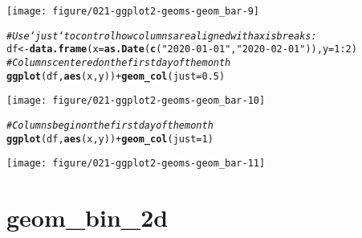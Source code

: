 \documentclass[a4paper,titlepage]{tufte-handout}\usepackage[]{graphicx}\usepackage[]{xcolor}
\makeatletter
\def\maxwidth{ %
  \ifdim\Gin@nat@width>\linewidth
    \linewidth
  \else
    \Gin@nat@width
  \fi
}
\newcommand{\hlnum}[1]{\textcolor[rgb]{0.686,0.059,0.569}{#1}}%
\newcommand{\hlsng}[1]{\textcolor[rgb]{0.192,0.494,0.8}{#1}}%
\newcommand{\hlcom}[1]{\textcolor[rgb]{0.678,0.584,0.686}{\textit{#1}}}%
\newcommand{\hlopt}[1]{\textcolor[rgb]{0,0,0}{#1}}%
\newcommand{\hldef}[1]{\textcolor[rgb]{0.345,0.345,0.345}{#1}}%
\newcommand{\hlkwb}[1]{\textcolor[rgb]{0.69,0.353,0.396}{#1}}%
\newcommand{\hlkwc}[1]{\textcolor[rgb]{0.333,0.667,0.333}{#1}}%
\newcommand{\hlkwd}[1]{\textcolor[rgb]{0.737,0.353,0.396}{\textbf{#1}}}%
\newenvironment{kframe}{%
 \def\at@end@of@kframe{}%
 \ifinner\ifhmode%
  \def\at@end@of@kframe{\end{minipage}}%
  \begin{minipage}{\columnwidth}%
 \fi\fi%
 \def\FrameCommand##1{\hskip\@totalleftmargin \hskip-\fboxsep
 \colorbox{shadecolor}{##1}\hskip-\fboxsep
     \hskip-\linewidth \hskip-\@totalleftmargin \hskip\columnwidth}%
 \MakeFramed {\advance\hsize-\width
   \@totalleftmargin\z@ \linewidth\hsize
   \@setminipage}}%
 {\par\unskip\endMakeFramed%
 \at@end@of@kframe}
\newenvironment{knitrout}{}{} %
\makeatother
\begin{document}
\begin{knitrout}
\begin{kframe}
\begin{alltt}
\end{alltt}
\end{kframe}
\texttt{[image: figure/021-ggplot2-geoms-geom\_bar-9]} 
\begin{kframe}\begin{alltt}
\hlcom{# Use `just` to control how columns are aligned with axis breaks:}
\hldef{df} \hlkwb{<-} \hlkwd{data.frame}\hldef{(}\hlkwc{x} \hldef{=} \hlkwd{as.Date}\hldef{(}\hlkwd{c}\hldef{(}\hlsng{"2020-01-01"}\hldef{,} \hlsng{"2020-02-01"}\hldef{)),} \hlkwc{y} \hldef{=} \hlnum{1}\hlopt{:}\hlnum{2}\hldef{)}
\hlcom{# Columns centered on the first day of the month}
\hlkwd{ggplot}\hldef{(df,} \hlkwd{aes}\hldef{(x, y))} \hlopt{+} \hlkwd{geom_col}\hldef{(}\hlkwc{just} \hldef{=} \hlnum{0.5}\hldef{)}
\end{alltt}
\end{kframe}
\texttt{[image: figure/021-ggplot2-geoms-geom\_bar-10]} 
\begin{kframe}\begin{alltt}
\hlcom{# Columns begin on the first day of the month}
\hlkwd{ggplot}\hldef{(df,} \hlkwd{aes}\hldef{(x, y))} \hlopt{+} \hlkwd{geom_col}\hldef{(}\hlkwc{just} \hldef{=} \hlnum{1}\hldef{)}
\end{alltt}
\end{kframe}
\texttt{[image: figure/021-ggplot2-geoms-geom\_bar-11]} 
\end{knitrout}


\section{geom\_bin\_2d}
\end{document}
